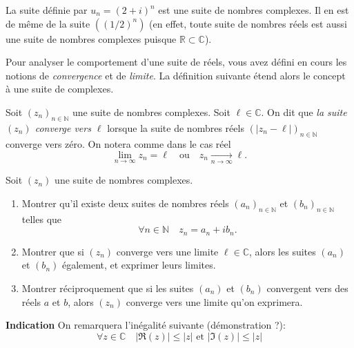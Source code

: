 \documentclass[12pt]{article}
\newcommand{\RR}{\mathbb R}
\newcommand{\CC}{\mathbb C}
\newcommand{\NN}{\mathbb N}
\theoremstyle{definition}
\begin{document}
\begin{exem}
La suite définie par $u_n = (2+i)^n$ est une suite de nombres complexes. Il en est de même de la suite $\left((1/2)^n\right)$ (en effet, toute suite de nombres réels est aussi une suite de nombres complexes puisque $\RR\subset \CC$).
\end{exem}

Pour analyser le comportement d'une suite de réels, vous avez défini en cours les notions de \textit{convergence} et de \textit{limite}. La définition suivante étend alors le concept à une suite de complexes.

\begin{defn}
Soit $(z_n)_{n\in\NN}$ une suite de nombres complexes. Soit $\ell \in\CC$. On dit que \textit{la suite $(z_n)$ converge vers $\ell$} lorsque la suite de nombres réels
$\left(
|z_n -\ell|\right)_{n\in\NN}
$
converge vers zéro. On notera comme dans le cas réel
\[
\lim_{n\to\infty}z_n = \ell \quad\text{ou}\quad z_n \xrightarrow[n\to\infty]{}\ell.
\]
\end{defn}

\begin{exer}
Soit $(z_n)$ une suite de nombres complexes.\begin{enumerate}
	\item Montrer qu'il existe deux suites de nombres réels $(a_n)_{n\in\NN}$ et $(b_n)_{n\in\NN}$ telles que
	\[
	\forall n\in\NN \quad z_n = a_n + ib_n.
	\]
	\item Montrer que si $(z_n)$ converge vers une limite $\ell\in\CC$, alors les suites $(a_n)$ et $(b_n)$ également, et exprimer leurs limites.
	\item Montrer réciproquement que si les suites $(a_n)$ et $(b_n)$ convergent vers des réels $a$ et $b$, alors $(z_n)$ converge vers une limite qu'on exprimera.
\end{enumerate} 
\noindent\textbf{Indication} On remarquera l'inégalité suivante (démonstration ?):
\[
\forall z\in\CC \quad |\Re(z)| \leq |z|\text{ et }|\Im(z)| \leq |z|
\]
\end{exer}
\end{document}
